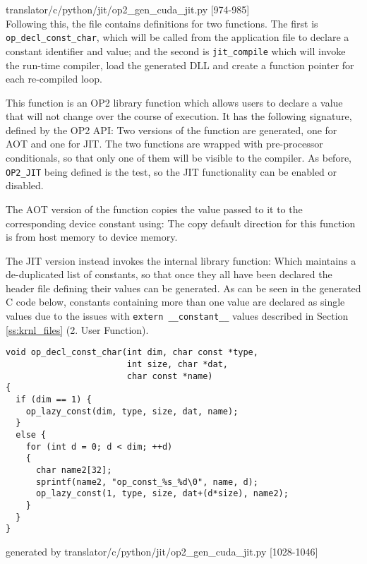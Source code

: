 \hspace*{\fill}\footnotesize{translator/c/python/jit/op2\_gen\_cuda\_jit.py [974-985]
\\
Following this, the file contains definitions for two functions. The first is \verb|op_decl_const_char|, which will be called from the application file to declare a constant identifier and value; and the second is \verb|jit_compile| which will invoke the run-time compiler, load the generated DLL and create a function pointer for each re-compiled loop.

This function is an OP2 library function which allows users to declare a value that will not change over the course of execution. It has the following signature, defined by the OP2 API\cite[p9]{manual}:
 Two versions of the function are generated, one for AOT and one for JIT. The two functions are wrapped with pre-processor conditionals, so that only one of them will be visible to the compiler. As before, \verb|OP2_JIT| being defined is the test, so the JIT functionality can be enabled or disabled.
\par
The AOT version of the function copies the value passed to it to the corresponding device constant using:
The copy default direction for this function is from host memory to device memory.
\par
The JIT version instead invokes the internal library function:
Which maintains a de-duplicated list of constants, so that once they all have been declared the header file defining their values can be generated. As can be seen in the generated C code below, constants containing more than one value are declared as single values due to the issues with \verb|extern __constant__| values described in Section \ref{ss:krnl_files} (2. User Function).
\begin{lstlisting}[linewidth = \textwidth, framesep=0pt]
void op_decl_const_char(int dim, char const *type,
                        int size, char *dat,
                        char const *name)
{
  if (dim == 1) {
    op_lazy_const(dim, type, size, dat, name);
  }
  else {
    for (int d = 0; d < dim; ++d)
    {
      char name2[32];
      sprintf(name2, "op_const_%s_%d\0", name, d);
      op_lazy_const(1, type, size, dat+(d*size), name2);
    }
  }
}
\end{lstlisting}
\vspace{-1em}
\hspace*{\fill}\footnotesize{generated by translator/c/python/jit/op2\_gen\_cuda\_jit.py [1028-1046]}

}
